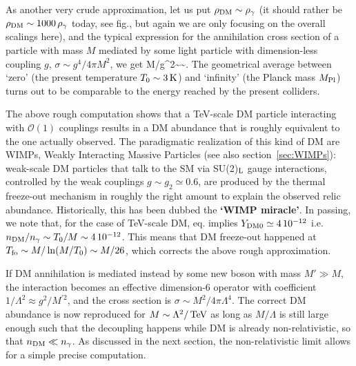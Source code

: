 As another very crude approximation, let us put $\rho_{\rm DM} \sim \rho_\gamma$
(it should rather be $\rho_{\rm DM} \sim 1000 \, \rho_\gamma$ today, see fig., but again we are only focusing on the overall scalings here), 
and the typical expression for the annihilation cross section of a particle with mass $M$
mediated by some light particle with dimension-less coupling $g$, $\sigma\sim g^4/4\pi M^2$, we get
\beq \label{eq:DMrelicmassTeV}
M/g^2\sim{}\sim\TeV.\eeq
The geometrical average between `zero' (the present temperature $T_0\sim 3\,{\rm K}$)
and `infinity' (the Planck mass $M_{\rm Pl}$)
turns out to be comparable to the energy reached by the present colliders.

\smallskip

The above rough computation shows that a TeV-scale DM particle interacting with $\mathcal{O}(1)$ couplings results in a DM abundance that is roughly equivalent to the one actually observed.
The paradigmatic realization of this kind of DM are WIMPs, Weakly Interacting Massive Particles (see also section~\ref{sec:WIMPs}): weak-scale DM particles that talk to the SM via SU(2)$_{\rm L}$ gauge interactions, controlled by the weak couplings $g \sim g_2\simeq 0.6$, are produced by the thermal freeze-out mechanism in roughly the right amount to explain the observed relic abundance. Historically, this has been dubbed the {\bf `WIMP miracle'}.
In passing, we note that, for the case of TeV-scale DM, eq. implies $Y_{\rm DM0} \simeq 4 \, 10^{-12}$ i.e.~$n_{\rm DM}/n_{\gamma} \sim T_0/M\sim 4 \, 10^{-12}$. This means that DM freeze-out happened at $T_{\rm fo} \sim M/\ln(M/T_0)\sim M/26$, which corrects the above rough approximation.

\smallskip

If  DM annihilation is  mediated instead by some new boson with mass $M' \gg M$,
the interaction becomes an effective dimension-6 operator with coefficient $1/\Lambda^2 \approx g^2/M^{\prime 2}$, and the cross section is $\sigma \sim M^2/4\pi \Lambda^4$. 
The correct DM abundance is now reproduced for
$M \sim \Lambda^2/\,{\rm TeV}$ as long as $M/\Lambda$ is still large enough such that the decoupling happens while DM is already non-relativistic, so that $n_{\rm DM}\ll n_\gamma$.
As discussed in the next section, the non-relativistic limit allows for a simple precise computation.



